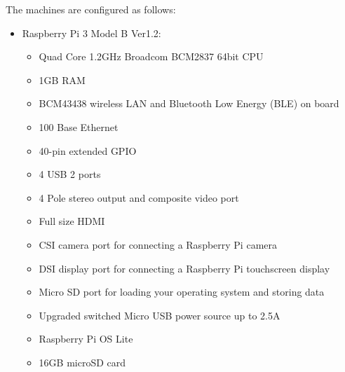 \documentclass[a4paper,11pt]{scrartcl}
\begin{document}
The machines are configured as follows:
\begin{itemize}
    \item Raspberry Pi 3 Model B Ver1.2:
    \begin{itemize}
        \item Quad Core 1.2GHz Broadcom BCM2837 64bit CPU
        \item 1GB RAM
        \item BCM43438 wireless LAN and Bluetooth Low Energy (BLE) on board
        \item 100 Base Ethernet
        \item 40-pin extended GPIO
        \item 4 USB 2 ports
        \item 4 Pole stereo output and composite video port
        \item Full size HDMI
        \item CSI camera port for connecting a Raspberry Pi camera
        \item DSI display port for connecting a Raspberry Pi touchscreen display
        \item Micro SD port for loading your operating system and storing data
        \item Upgraded switched Micro USB power source up to 2.5A
        \item Raspberry Pi OS Lite
        \item 16GB microSD card
    \end{itemize}
\end{itemize}
\end{document}

